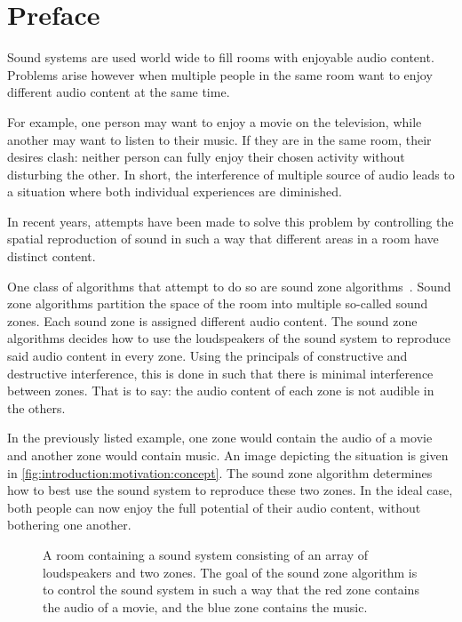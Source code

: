 \section{Preface}
\label{ch:introduction:preface}
Sound systems are used world wide to fill rooms with enjoyable audio content. 
Problems arise however when multiple people in the same room want to enjoy different audio content at the same time.

For example, one person may want to enjoy a movie on the television, while another may want to listen to their music.
If they are in the same room, their desires clash: neither person can fully enjoy their chosen activity without disturbing
the other.
In short, the interference of multiple source of audio leads to a situation where both individual experiences are diminished.

In recent years, attempts have been made to solve this problem by controlling the spatial reproduction of sound in such
a way that different areas in a room have distinct content.

One class of algorithms that attempt to do so are sound zone algorithms~\cite{betlehem2015personal}.
Sound zone algorithms partition the space of the room into multiple so-called sound zones.
Each sound zone is assigned different audio content.
The sound zone algorithms decides how to use the loudspeakers of the sound system to reproduce said audio content in every zone.
Using the principals of constructive and destructive interference, this is done in such that there is minimal interference between zones.
That is to say: the audio content of each zone is not audible in the others.

In the previously listed example, one zone would contain the audio of a movie and another zone would contain music.
An image depicting the situation is given in \autoref{fig:introduction:motivation:concept}.
The sound zone algorithm determines how to best use the sound system to reproduce these two zones.
In the ideal case, both people can now enjoy the full potential of their audio content, without bothering one another.

\begin{figure}[]
    \centering
    \scalebox{1.0}{}
    \caption{A room containing a sound system consisting of an array of loudspeakers and two zones.
                The goal of the sound zone algorithm is to control the sound system in such a way that the red zone
                contains the audio of a movie, and the blue zone contains the music.}
    \label{fig:introduction:motivation:concept}
\end{figure}

